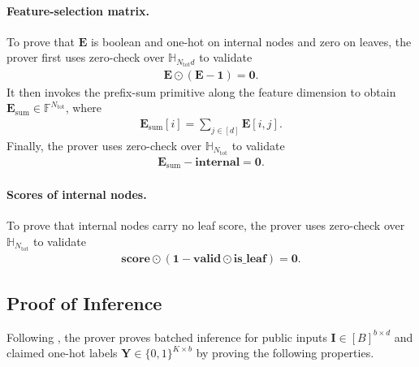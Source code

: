 \paragraph{Feature-selection matrix.}
To prove that $\mathbf{E}$ is boolean and one-hot on internal nodes and zero on leaves,
    the prover first uses zero-check over $\mathbb{H}_{N_{\mathrm{tot}}d}$ to validate
    \begin{align}
        \mathbf{E}\odot(\mathbf{E}-\mathbf{1}) = \mathbf{0}.
    \end{align}
    It then invokes the prefix-sum primitive along the feature dimension to obtain
    $\mathbf{E}_{\mathrm{sum}}\in\mathbb{F}^{N_{\mathrm{tot}}}$, where
    \begin{align}
        \mathbf{E}_{\mathrm{sum}}[i]=\sum_{j\in[d]}\mathbf{E}[i,j].
    \end{align}
    Finally, the prover uses zero-check over $\mathbb{H}_{N_{\mathrm{tot}}}$ to validate
    \begin{align}
        \mathbf{E}_{\mathrm{sum}}-\mathbf{internal}=\mathbf{0}.
    \end{align}

\paragraph{Scores of internal nodes.}
To prove that internal nodes carry no leaf score, the prover uses zero-check over
    $\mathbb{H}_{N_{\mathrm{tot}}}$ to validate
    \begin{align}
        \mathbf{score}\odot(\mathbf{1}-\mathbf{valid}\odot\mathbf{is\_leaf})=\mathbf{0}.
    \end{align}

\subsection{Proof of Inference}\label{subsec:zkgbdt-inference}

Following , the prover proves batched inference for
public inputs $\mathbf{I}\in [B]^{b\times d}$ and claimed one-hot labels
$\mathbf{Y}\in\{0, 1\}^{K\times b}$ by proving the following properties.

